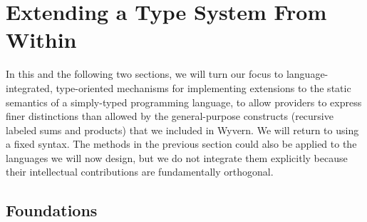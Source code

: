 


\section{Extending a Type System From Within}\label{att}
In this and the following two sections, we will turn our focus to language-integrated, type-oriented mechanisms for implementing extensions to the static semantics of a simply-typed programming language, to allow providers to express finer distinctions than allowed by the general-purpose constructs (recursive labeled sums and products) that we included in Wyvern. We will return to using a fixed  syntax. The methods in the previous section could also be applied to the languages we will now design, but we do not integrate them explicitly because their intellectual  contributions are fundamentally orthogonal. %
\subsection{Foundations}

